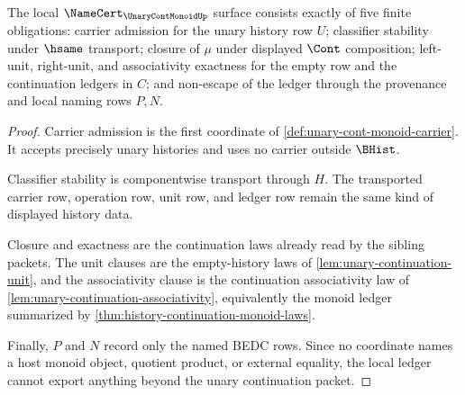\begin{theorem}
\label{thm:unary-cont-monoid-namecert-obligations}
The local $\NameCert_{\UnaryContMonoidUp}$ surface consists exactly of five finite obligations: carrier admission for the unary history row $U$; classifier stability under $\hsame$ transport; closure of $\mu$ under displayed $\Cont$ composition; left-unit, right-unit, and associativity exactness for the empty row and the continuation ledgers in $C$; and non-escape of the ledger through the provenance and local naming rows $P,N$.
\end{theorem}
\begin{proof}
Carrier admission is the first coordinate of \autoref{def:unary-cont-monoid-carrier}. It accepts precisely unary histories and uses no carrier outside $\BHist$.

Classifier stability is componentwise transport through $H$. The transported carrier row, operation row, unit row, and ledger row remain the same kind of displayed history data.

Closure and exactness are the continuation laws already read by the sibling packets. The unit clauses are the empty-history laws of \autoref{lem:unary-continuation-unit}, and the associativity clause is the continuation associativity law of \autoref{lem:unary-continuation-associativity}, equivalently the monoid ledger summarized by \autoref{thm:history-continuation-monoid-laws}.

Finally, $P$ and $N$ record only the named BEDC rows. Since no coordinate names a host monoid object, quotient product, or external equality, the local ledger cannot export anything beyond the unary continuation packet.
\end{proof}

